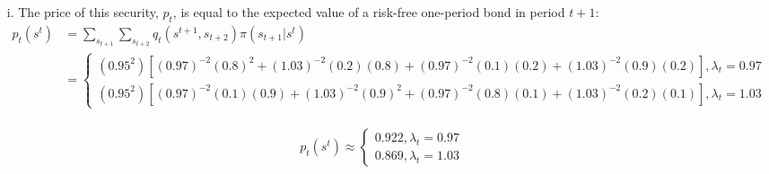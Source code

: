 \documentclass{article}
\begin{document}
\begin{itemize}
	\item[i.] The price of this security, $p_t$, is equal to the expected value of a risk-free one-period bond in period $t+1$:
		{\footnotesize \begin{align*}
			p_t(s^t) 	&= \sum_{s_{t+1}}\sum_{s_{t+2}}q_t(s^{t+1},s_{t+2})\pi(s_{t+1}|s^t)	\\
						&= \begin{cases}
								(0.95^2)\left[(0.97)^{-2}(0.8)^2 + (1.03)^{-2}(0.2)(0.8) + 
									(0.97)^{-2}(0.1)(0.2) + (1.03)^{-2}(0.9)(0.2)\right], \lambda_t = 0.97	\\
								(0.95^2)\left[(0.97)^{-2}(0.1)(0.9) + (1.03)^{-2}(0.9)^2 + 
									(0.97)^{-2}(0.8)(0.1) + (1.03)^{-2}(0.2)(0.1)\right], \lambda_t = 1.03
							\end{cases}  
		\end{align*} }																				\\
		\[
			p_t(s^t) 	\approx \begin{cases}
									0.922, \lambda_t = 0.97	\\
									0.869, \lambda_t = 1.03
								\end{cases} 
		\]
	
\end{itemize}


\end{document}
